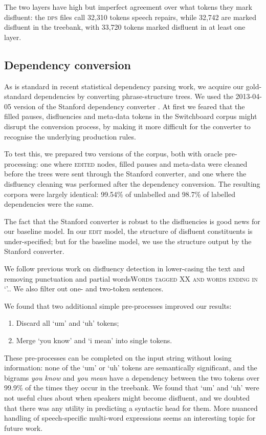 \documentclass[11pt,letterpaper]{article}
\begin{document}
The two layers have high but imperfect agreement over
what tokens they mark disfluent: the \textsc{dps} files call
32,310 tokens speech repairs, while 32,742 are marked disfluent in the treebank,
with 33,720 tokens marked disfluent in at least one layer.

\subsection{Dependency conversion}

As is standard in recent statistical dependency parsing work, we acquire our
gold-standard dependencies by converting phrase-structure trees.
We used the 2013-04-05 version of the Stanford dependency converter \citep{stanford_deps}.
At first we feared that the filled pauses, disfluencies and meta-data tokens in
the Switchboard corpus might disrupt the conversion process, by making it more
difficult for the converter to recognise the underlying production rules.

To test this, we prepared two versions of the corpus, both with oracle pre-processing:
one where \textsc{edited} nodes, filled pauses and meta-data were cleaned before
the trees were sent through the Stanford converter, and one where the disfluency
cleaning was performed after the dependency conversion. The resulting corpora
were largely identical: 99.54\% of unlabelled and 98.7\% of labelled dependencies
were the same.

The fact that the Stanford converter is robust to the disfluencies is good news
for our baseline model. In our \textsc{edit} model, the structure of disfluent
constituents is under-specified; but for the baseline model, we use the structure
output by the Stanford converter.

We follow previous work on disfluency detection in lower-casing the text and
removing punctuation and partial words\textsc{Words tagged XX and words ending in
`'.}.  We also filter out one- and two-token sentences.

We found that two additional simple pre-processes improved our results:

\begin{enumerate}
    \item Discard all `um' and `uh' tokens;
    \item Merge `you know' and `i mean' into single tokens.
\end{enumerate}

These pre-processes can be completed on the input string without losing information:
none of the `um' or `uh' tokens are semantically significant, and
the bigrams \emph{you know} and \emph{you mean} have a dependency between the two
tokens over 99.9\% of the times they occur in the treebank. We found that `um'
and `uh' were not useful clues about when speakers might become disfluent, and
we doubted that there was any utility in predicting a syntactic head for them.
More nuanced handling of speech-specific multi-word expressions seems an interesting
topic for future work.
\end{document}
